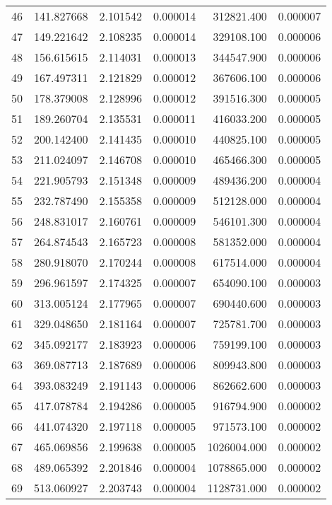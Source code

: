 \begin{tabular}{lrrrrr}
46 &   141.827668 &  2.101542 &  0.000014 &   312821.400 &  0.000007 \\
47 &   149.221642 &  2.108235 &  0.000014 &   329108.100 &  0.000006 \\
48 &   156.615615 &  2.114031 &  0.000013 &   344547.900 &  0.000006 \\
49 &   167.497311 &  2.121829 &  0.000012 &   367606.100 &  0.000006 \\
50 &   178.379008 &  2.128996 &  0.000012 &   391516.300 &  0.000005 \\
51 &   189.260704 &  2.135531 &  0.000011 &   416033.200 &  0.000005 \\
52 &   200.142400 &  2.141435 &  0.000010 &   440825.100 &  0.000005 \\
53 &   211.024097 &  2.146708 &  0.000010 &   465466.300 &  0.000005 \\
54 &   221.905793 &  2.151348 &  0.000009 &   489436.200 &  0.000004 \\
55 &   232.787490 &  2.155358 &  0.000009 &   512128.000 &  0.000004 \\
56 &   248.831017 &  2.160761 &  0.000009 &   546101.300 &  0.000004 \\
57 &   264.874543 &  2.165723 &  0.000008 &   581352.000 &  0.000004 \\
58 &   280.918070 &  2.170244 &  0.000008 &   617514.000 &  0.000004 \\
59 &   296.961597 &  2.174325 &  0.000007 &   654090.100 &  0.000003 \\
60 &   313.005124 &  2.177965 &  0.000007 &   690440.600 &  0.000003 \\
61 &   329.048650 &  2.181164 &  0.000007 &   725781.700 &  0.000003 \\
62 &   345.092177 &  2.183923 &  0.000006 &   759199.100 &  0.000003 \\
63 &   369.087713 &  2.187689 &  0.000006 &   809943.800 &  0.000003 \\
64 &   393.083249 &  2.191143 &  0.000006 &   862662.600 &  0.000003 \\
65 &   417.078784 &  2.194286 &  0.000005 &   916794.900 &  0.000002 \\
66 &   441.074320 &  2.197118 &  0.000005 &   971573.100 &  0.000002 \\
67 &   465.069856 &  2.199638 &  0.000005 &  1026004.000 &  0.000002 \\
68 &   489.065392 &  2.201846 &  0.000004 &  1078865.000 &  0.000002 \\
69 &   513.060927 &  2.203743 &  0.000004 &  1128731.000 &  0.000002 \\

\end{tabular}
